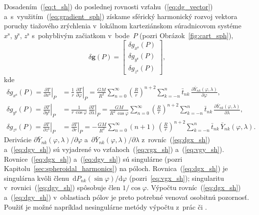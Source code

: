 \documentclass[a4paper,12pt]{book}
\newcommand{\diff}{\mathrm d}
\let\vec\mathbf
\begin{document}
Dosadením~(\ref{eq:t_sh}) do poslednej rovnosti vzťahu~(\ref{eq:dg_vector}) 
a~s~využitím~(\ref{eq:gradient_sph}) získame sférický harmonický rozvoj vektora 
poruchy tiažového zrýchlenia v~lokálnom karteziánskom súradnicovom 
systéme~$x^\mathrm{s}$, $y^\mathrm{s}$, $z^\mathrm{s}$ s~pohyblivým začiatkom 
v~bode~$P$ (pozri Obrázok~\ref{fig:cart_sph}),
%
\begin{equation}
\label{eq:dg_vec_sph}
\delta \vec g(P) =
%
\begin{bmatrix}
\delta g_{x^\mathrm{s}}(P)\\
\delta g_{y^\mathrm{s}}(P)\\
\delta g_{z^\mathrm{s}}(P)
\end{bmatrix}
%
{,}
\end{equation}
%
kde
%
\begin{align}
\label{eq:dgx_sh}
\delta g_{x^\mathrm{s}}(P) = \left.\frac{\partial T}{\partial 
x^\mathrm{s}}\right|_P &= \frac{1}{r} \, \left.\frac{\partial T}{\partial 
\varphi}\right|_P = \frac{GM}{R^2} \sum_{n = 0}^\infty \left( \frac{R}{r} 
\right)^{n + 2} \sum_{k = -n}^{n} \bar{t}_{nk} \, \frac{\partial 
\bar{Y}_{nk}(\varphi, \lambda)}{\partial \varphi}{,}\\
%
\label{eq:dgy_sh}
\delta g_{y^\mathrm{s}}(P) = \left.\frac{\partial T}{\partial 
y^\mathrm{s}}\right|_P &= \frac{1}{r \, \cos\varphi} \, \left.\frac{\partial 
T}{\partial \lambda}\right|_P = \frac{GM}{R^2 \, \cos\varphi} \sum_{n 
= 0}^\infty \left( \frac{R}{r} \right)^{n + 2} \sum_{k = -n}^{n}\bar{t}_{nk} \, 
\frac{\partial \bar{Y}_{nk}(\varphi, \lambda)}{\partial \lambda}{,}\\
%
\label{eq:dgz_sh}
\delta g_{z^\mathrm{s}}(P) = \left.\frac{\partial T}{\partial 
z^\mathrm{s}}\right|_P &= \left.\frac{\partial T}{\partial r}\right|_P 
= - \frac{GM}{R^2} \sum_{n = 0}^\infty (n + 1) \, \left( \frac{R}{r} \right)^{n 
+ 2} \sum_{k = -n}^{n} \bar{t}_{nk} \, \bar{Y}_{nk}(\varphi, \lambda){.}
\end{align}
%
Derivácie $\partial \bar{Y}_{nk}(\varphi, \lambda) \slash \partial \varphi$ 
a~$\partial \bar{Y}_{nk}(\varphi, \lambda) \slash \partial \lambda$ 
z~rovníc~(\ref{eq:dgx_sh}) a~(\ref{eq:dgy_sh}) sú vyjadrené vo 
vzťahoch~(\ref{eq:vgx_sh}) a~(\ref{eq:vgy_sh}).  Rovnice~(\ref{eq:dgx_sh}) 
a~(\ref{eq:dgy_sh}) sú singulárne (pozri 
Kapitolu~\ref{sec:spheroidal_harmonics}) na póloch.  Rovnica~(\ref{eq:dgx_sh}) 
je singulárna kvôli členu~$\diff P_{nk}(\sin\varphi) \slash \diff \varphi$ 
(pozri~\ref{eq:vgx_sh}); singularitu v~rovnici~(\ref{eq:dgy_sh}) spôsobuje člen 
$1 \slash \cos\varphi$.  Výpočtu rovníc~(\ref{eq:dgx_sh}) a~(\ref{eq:dgy_sh}) 
v~oblastiach pólov je preto potrebné venovať osobitnú pozornosť.  Použiť je 
možné napríklad nesingulárne metódy výpočtu z~prác \textcite{Petrovskaya2012} 
či \textcite{Sebera2013} \parencite[pozri tiež][]{Ivanov2018}.
\end{document}
